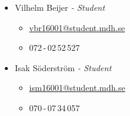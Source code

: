 \begin{itemize}
        \item Vilhelm Beijer \textit{- Student}
            \begin{itemize}
                \item \href{mailto:vbr16001@student.mdh.se}{vbr16001@student.mdh.se}
                \item 072\,-\,02\,52\,527
            \end{itemize}

        \item Isak Söderström \textit{- Student}
            \begin{itemize}
                \item \href{mailto:ism16001@student.mdh.se}{ism16001@student.mdh.se}
                \item 070\,-\,07\,34\,057
            \end{itemize}
\end{itemize}





